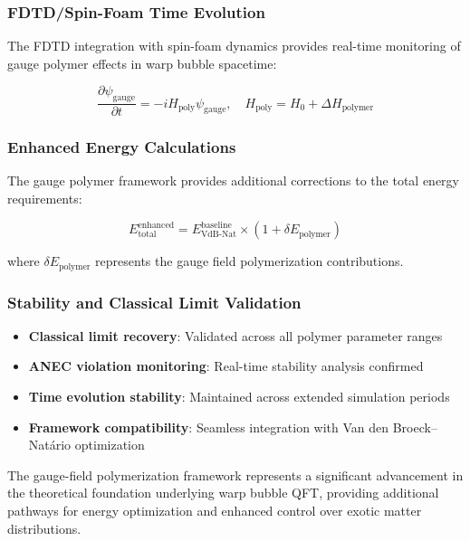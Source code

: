 \documentclass[11pt]{article}
\begin{document}
\subsubsection{FDTD/Spin-Foam Time Evolution}
The FDTD integration with spin-foam dynamics provides real-time monitoring of gauge polymer effects in warp bubble spacetime:

\begin{equation}
\frac{\partial \psi_{\text{gauge}}}{\partial t} = -i H_{\text{poly}} \psi_{\text{gauge}}, \quad H_{\text{poly}} = H_0 + \Delta H_{\text{polymer}}
\end{equation}

\subsubsection{Enhanced Energy Calculations}
The gauge polymer framework provides additional corrections to the total energy requirements:

\begin{equation}
E_{\text{total}}^{\text{enhanced}} = E_{\text{VdB-Nat}}^{\text{baseline}} \times (1 + \delta E_{\text{polymer}})
\end{equation}

where $\delta E_{\text{polymer}}$ represents the gauge field polymerization contributions.

\subsubsection{Stability and Classical Limit Validation}
\begin{itemize}
    \item \textbf{Classical limit recovery}: Validated across all polymer parameter ranges
    \item \textbf{ANEC violation monitoring}: Real-time stability analysis confirmed
    \item \textbf{Time evolution stability}: Maintained across extended simulation periods
    \item \textbf{Framework compatibility}: Seamless integration with Van den Broeck–Natário optimization
\end{itemize}

The gauge-field polymerization framework represents a significant advancement in the theoretical foundation underlying warp bubble QFT, providing additional pathways for energy optimization and enhanced control over exotic matter distributions.
\end{document}
